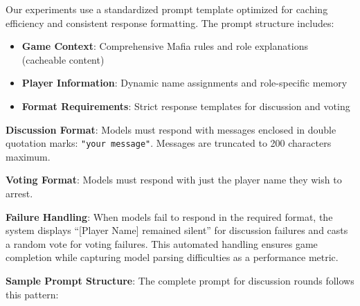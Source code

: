 \documentclass{article}
\begin{document}
Our experiments use a standardized prompt template optimized for caching efficiency and consistent response formatting. The prompt structure includes:

\begin{itemize}
    \item \textbf{Game Context}: Comprehensive Mafia rules and role explanations (cacheable content)
    \item \textbf{Player Information}: Dynamic name assignments and role-specific memory
    \item \textbf{Format Requirements}: Strict response templates for discussion and voting
\end{itemize}

\textbf{Discussion Format}: Models must respond with messages enclosed in double quotation marks: \texttt{"your message"}. Messages are truncated to 200 characters maximum.

\textbf{Voting Format}: Models must respond with just the player name they wish to arrest.

\textbf{Failure Handling}: When models fail to respond in the required format, the system displays ``[Player Name] remained silent'' for discussion failures and casts a random vote for voting failures. This automated handling ensures game completion while capturing model parsing difficulties as a performance metric.

\textbf{Sample Prompt Structure}: The complete prompt for discussion rounds follows this pattern:
\end{document}

